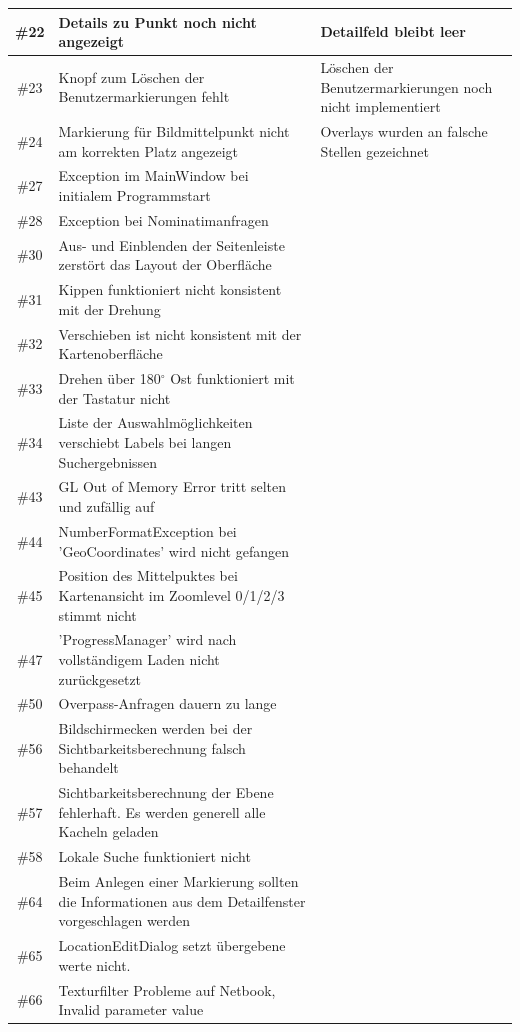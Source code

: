 \documentclass[10pt]{scrreprt}
\begin{document}
\begin{longtable}{|c|p{5.2cm}|p{8.2cm}|}
\hline
\#22 & Details zu Punkt noch nicht angezeigt & Detailfeld bleibt leer \\
\hline
\#23 & Knopf zum Löschen der Benutzermarkierungen fehlt & Löschen der Benutzermarkierungen noch nicht implementiert \\
\hline
\#24 & Markierung für Bildmittelpunkt nicht am korrekten Platz angezeigt & Overlays wurden an falsche Stellen gezeichnet \\
\hline
\#27 & Exception im MainWindow bei initialem Programmstart & \\
\hline
\#28 & Exception bei Nominatimanfragen & \\
\hline
\#30 & Aus- und Einblenden der Seitenleiste zerstört das Layout der Oberfläche & \\
\hline
\#31 & Kippen funktioniert nicht konsistent mit der Drehung & \\
\hline
\#32 & Verschieben ist nicht konsistent mit der Kartenoberfläche & \\
\hline
\#33 & Drehen über 180$^\circ$ Ost funktioniert mit der Tastatur nicht & \\
\hline
\#34 & Liste der Auswahlmöglichkeiten verschiebt Labels bei langen Suchergebnissen & \\
\hline
\#43 & GL Out of Memory Error tritt selten und zufällig auf & \\
\hline
\#44 & NumberFormatException bei 'GeoCoordinates' wird nicht gefangen & \\
\hline
\#45 & Position des Mittelpuktes bei Kartenansicht im Zoomlevel 0/1/2/3 stimmt nicht & \\
\hline
\#47 & 'ProgressManager' wird nach vollständigem Laden nicht zurückgesetzt & \\
\hline 
\#50 & Overpass-Anfragen dauern zu lange & \\
\hline
\#56 & Bildschirmecken werden bei der Sichtbarkeitsberechnung falsch behandelt & \\
\hline
\#57 & Sichtbarkeitsberechnung der Ebene fehlerhaft. Es werden generell alle Kacheln geladen & \\
\hline
\#58 & Lokale Suche funktioniert nicht & \\
\hline
\#64 & Beim Anlegen einer Markierung sollten die Informationen aus dem Detailfenster vorgeschlagen werden & \\
\hline
\#65 & LocationEditDialog setzt übergebene werte nicht. & \\
\hline
\#66 & Texturfilter Probleme auf Netbook, Invalid parameter value & \\

\end{longtable}
\end{document}
